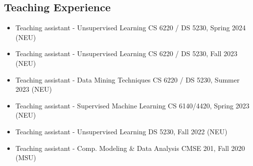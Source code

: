 \documentclass[11pt,a4paper,sans]{moderncv} %
\begin{document}
\subsection{Teaching Experience}
\begin{itemize}
\setlength\itemsep{-0.5em}	
\item Teaching assistant - Unsupervised Learning \hfill CS 6220 / DS 5230, Spring 2024 (NEU)
\item Teaching assistant - Unsupervised Learning \hfill CS 6220 / DS 5230, Fall 2023 (NEU)
\item Teaching assistant - Data Mining Techniques \hfill CS 6220 / DS 5230, Summer 2023 (NEU)
\item Teaching assistant - Supervised Machine Learning \hfill CS 6140/4420, Spring 2023 (NEU)
\item Teaching assistant - Unsupervised Learning \hfill DS 5230, Fall 2022 (NEU)
\item Teaching assistant - Comp. Modeling \& Data Analysis \hfill  CMSE 201, Fall 2020 (MSU)
\end{itemize}
 
\end{document}
